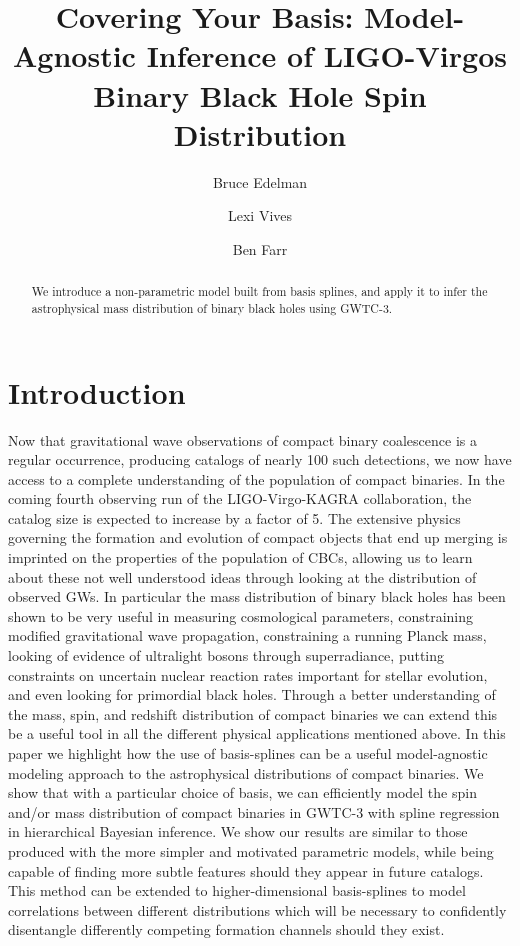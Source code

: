 \documentclass[twocolumn, linenumber]{aastex63}
\begin{document}
\title{Covering Your Basis: Model-Agnostic Inference of LIGO-Virgos Binary Black Hole Spin Distribution}

\author{Bruce Edelman}

\author{Lexi Vives}

\author{Ben Farr}

\begin{abstract}
We introduce a non-parametric model built from basis splines, and apply it to infer the astrophysical mass distribution of binary black holes using GWTC-3.
\end{abstract}


\section{Introduction} \label{sec:intro}

Now that gravitational wave observations of compact binary coalescence is a regular occurrence, producing catalogs of nearly 100 such detections, we now have access to a complete understanding of the population of compact binaries. In the coming fourth observing run of the LIGO-Virgo-KAGRA collaboration, the catalog size is expected to increase by a factor of 5. The extensive physics governing the formation and evolution of compact objects that end up merging is imprinted on the properties of the population of CBCs, allowing us to learn about these not well understood ideas through looking at the distribution of observed GWs. In particular the mass distribution of binary black holes has been shown to be very useful in measuring cosmological parameters, constraining modified gravitational wave propagation, constraining a running Planck mass, looking of evidence of ultralight bosons through superradiance, putting constraints on uncertain nuclear reaction rates important for stellar evolution, and even looking for primordial black holes. Through a better understanding of the mass, spin, and redshift distribution of compact binaries we can extend this be a useful tool in all the different physical applications mentioned above. In this paper we highlight how the use of basis-splines can be a useful model-agnostic modeling approach to the astrophysical distributions of compact binaries. We show that with a particular choice of basis, we can efficiently model the spin and/or mass distribution of compact binaries in GWTC-3 with spline regression in hierarchical Bayesian inference. We show our results are similar to those produced with the more simpler and motivated parametric models, while being capable of finding more subtle features should they appear in future catalogs. This method can be extended to higher-dimensional basis-splines to model correlations between different distributions which will be necessary to confidently disentangle differently competing formation channels should they exist. 
\end{document}
